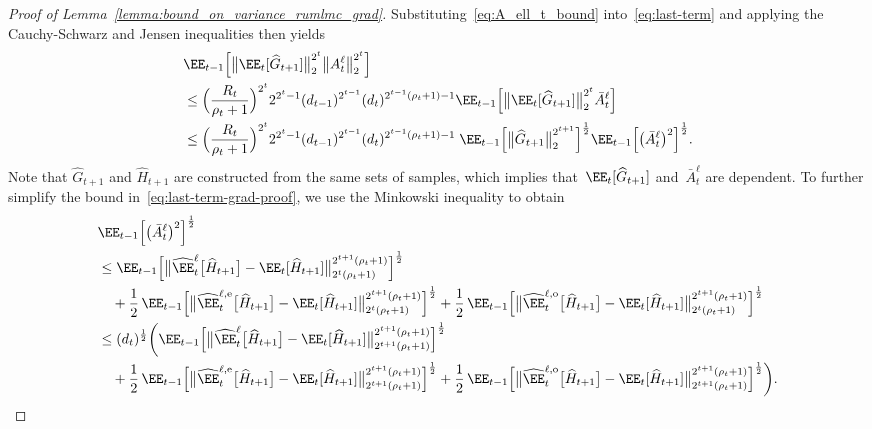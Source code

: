 \documentclass[11pt]{article}
\let\hat\widehat
\begin{document}
\begin{proof}[Proof of Lemma~\ref{lemma:bound_on_variance_rumlmc_grad}]
Substituting~\eqref{eq:A_ell_t_bound} into~\eqref{eq:last-term} and applying the Cauchy-Schwarz and Jensen inequalities then yields
\begin{equation}
\label{eq:last-term-grad-proof}
\begin{aligned}
    & \EE_{t-1}\Big[\big\|\EE_t[\hat{G}_{t+1}] \big\|_{2}^{2^t} \big\| A^\ell_t\big\|_{2}^{2^t}\Big]\\
    & \leq \Big(\frac{R_t}{\rho_t+1}\Big)^{2^t} 2^{2^t-1} (d_{t-1})^{2^{t-1}} (d_t)^{2^{t-1}(\rho_t+1)-1} \EE_{t-1}\Big[\big\|\EE_t[\hat{G}_{t+1}] \big\|_{2}^{2^t}  \bar{A}_t^\ell \Big] \\
    & \leq  \Big(\frac{R_t}{\rho_t+1}\Big)^{2^t} 2^{2^t-1} (d_{t-1})^{2^{t-1}} (d_t)^{2^{t-1}(\rho_t+1)-1} \; \EE_{t-1}\Big[\big\|\hat{G}_{t+1} \big\|_{2}^{2^{t+1}}\Big]^\frac{1}{2} \EE_{t-1}\Big[ \big(\bar{A}_t^\ell\big)^2\Big]^\frac{1}{2} .
\end{aligned}
\end{equation}
Note that $\hat G_{t+1}$ and $\hat H_{t+1}$ are constructed from the same sets of samples, which implies that~$\EE_t[\hat{G}_{t+1}]$ and~$\bar{A}_t^\ell$ are dependent. 
To further simplify the bound in~\eqref{eq:last-term-grad-proof}, we use the Minkowski inequality to obtain
\begin{align*}
    & \EE_{t-1}\Big[ \big(\bar{A}_t^\ell\big)^2\Big]^\frac{1}{2} \\
    & \leq \EE_{t-1}\Big[\big\|\hat\EE_t^{\ell}\big[\hat{H}_{t+1}\big] - \EE_t[\hat{H}_{t+1}]\big\|_{2^t(\rho_t+1)}^{2^{t+1}(\rho_t+1)}\Big]^\frac{1}{2} \\
    &\quad +\frac{1}{2} \, \EE_{t-1}\Big[\big\|\hat\EE_t^{\ell, {\rm e}}\big[\hat{H}_{t+1}\big] - \EE_t[\hat{H}_{t+1}]\big\|_{2^t(\rho_t+1)}^{2^{t+1}(\rho_t+1)}\Big]^\frac{1}{2} +\frac{1}{2} \, \EE_{t-1}\Big[\big\|\hat\EE_t^{\ell, {\rm o}}\big[\hat{H}_{t+1}\big] - \EE_t[\hat{H}_{t+1}]\big\|_{2^t(\rho_t+1)}^{2^{t+1}(\rho_t+1)}\Big]^\frac{1}{2}\\
    & \leq (d_t)^\frac{1}{2} \bigg( \EE_{t-1}\Big[\big\|\hat\EE_t^{\ell}\big[\hat{H}_{t+1}\big] - \EE_t[\hat{H}_{t+1}]\big\|_{2^{t+1}(\rho_t+1)}^{2^{t+1}(\rho_t+1)}\Big]^\frac{1}{2} \\
    & \quad +\frac{1}{2} \, \EE_{t-1}\Big[\big\|\hat\EE_t^{\ell, {\rm e}}\big[\hat{H}_{t+1}\big] - \EE_t[\hat{H}_{t+1}]\big\|_{2^{t+1}(\rho_t+1)}^{2^{t+1}(\rho_t+1)}\Big]^\frac{1}{2} +\frac{1}{2} \, \EE_{t-1}\Big[\big\|\hat\EE_t^{\ell, {\rm o}}\big[\hat{H}_{t+1}\big] - \EE_t[\hat{H}_{t+1}]\big\|_{2^{t+1}(\rho_t+1)}^{2^{t+1}(\rho_t+1)}\Big]^\frac{1}{2} \bigg).

\end{align*}
\end{proof}
\end{document}
